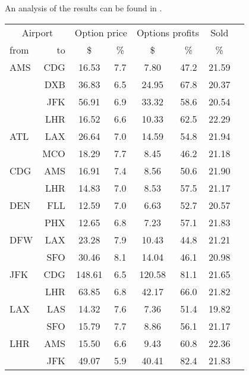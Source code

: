An analysis of the results can be found in .
\\[2em]
\begin{table}[h]
    \small
    \begin{center}
        \begin{tabular}{l r c c c c c c}
            \toprule
            \multicolumn{2}{c}{Airport}  & \multicolumn{2}{c}{Option price} & \multicolumn{2}{c}{Options profits}  &  Sold  \\[.4ex]
            from  &  to  &  \$  & \%  &  \$  & \%  & \%  \\
            \midrule
AMS  &  CDG &   16.53  &     7.7  &    7.80  &    47.2  &   21.59  \\
     &  DXB &   36.83  &     6.5  &   24.95  &    67.8  &   20.37  \\
     &  JFK &   56.91  &     6.9  &   33.32  &    58.6  &   20.54  \\
     &  LHR &   16.52  &     6.6  &   10.33  &    62.5  &   22.29  \\[.5ex]
ATL  &  LAX &   26.64  &     7.0  &   14.59  &    54.8  &   21.94  \\
     &  MCO &   18.29  &     7.7  &    8.45  &    46.2  &   21.18  \\[.5ex]
CDG  &  AMS &   16.91  &     7.4  &    8.56  &    50.6  &   21.90  \\
     &  LHR &   14.83  &     7.0  &    8.53  &    57.5  &   21.17  \\[.5ex]
DEN  &  FLL &   12.59  &     7.0  &    6.63  &    52.7  &   20.57  \\
     &  PHX &   12.65  &     6.8  &    7.23  &    57.1  &   21.83  \\[.5ex]
DFW  &  LAX &   23.28  &     7.9  &   10.43  &    44.8  &   21.21  \\
     &  SFO &   30.46  &     8.1  &   14.04  &    46.1  &   20.98  \\[.5ex]
JFK  &  CDG &  148.61  &     6.5  &  120.58  &    81.1  &   21.65  \\
     &  LHR &   63.85  &     6.8  &   42.17  &    66.0  &   21.82  \\[.5ex]
LAX  &  LAS &   14.32  &     7.6  &    7.36  &    51.4  &   19.82  \\
     &  SFO &   15.79  &     7.7  &    8.86  &    56.1  &   21.17  \\[.5ex]
LHR  &  AMS &   15.50  &     6.6  &    9.43  &    60.8  &   22.36  \\
     &  JFK &   49.07  &     5.9  &   40.41  &    82.4  &   21.83  \\

\end{tabular}
\end{center}
\end{table}
